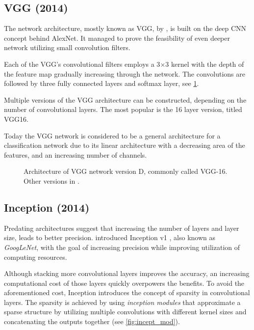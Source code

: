 \subsection{VGG (2014)}
\label{sec:VGG}
The network architecture, mostly known as VGG, by \citeauthor{bib:vgg} \cite{bib:vgg}, is built on the deep CNN concept behind AlexNet. It managed to prove the feasibility of even deeper network utilizing small convolution filters. 

Each of the VGG's convolutional filters employs a 3$\times$3 kernel with the depth of the feature map gradually increasing through the network. The convolutions are followed by three fully connected layers and softmax layer, see \cref{tab:vggarch}. 

Multiple versions of the VGG architecture can be constructed, depending on the number of convolutional layers. The most popular is the 16 layer version, titled VGG16.

Today the VGG network is considered to be a general architecture for a classification network due to its linear architecture with a decreasing area of the features, and an increasing number of channels. 

\begin{figure}
    \centering
    \caption[VGG-16 architecture]%
    {Architecture of VGG network version D, commonly called VGG-16. Other versions in \cite[table 1]{bib:vgg}.}
    \label{tab:vggarch}
\end{figure}

\subsection{Inception (2014)}
\label{sec:inception}
Predating architectures suggest that increasing the number of layers and layer size, leads to better precision. \citeauthor{bib:googlenet} introduced Inception v1 \cite{bib:googlenet}, also known as \textit{GoogLeNet}, with the goal of increasing precision while improving utilization of computing resources.

Although stacking more convolutional layers improves the accuracy, an increasing computational cost of those layers quickly overpowers the benefits. To avoid the aforementioned cost, Inception introduces the concept of sparsity in convolutional layers. The sparsity is achieved by using \textit{inception modules} that approximate a sparse structure by utilizing multiple convolutions with different kernel sizes and concatenating the outputs together (see \cref{fig:incept_mod}). 

